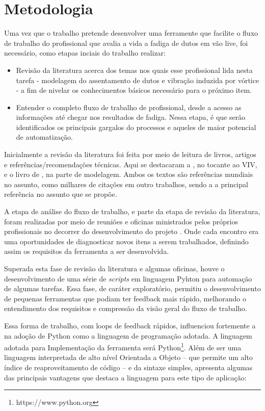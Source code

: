 \chapter{Metodologia}\label{chap:metodologia}


Uma vez que o trabalho pretende desenvolver uma ferramente que facilite o fluxo de trabalho do profissional que avalia a vida a fadiga de dutos em vão live, foi necessário, como etapas inciais do trabalho realizar:

\begin{itemize}
    \item Revisão da literatura acerca dos temas nos quais esse profissional lida nesta tarefa - modelagem do assentamento de dutos e vibração induzida por vórtice - a fim de nivelar os conhecimentos básicos necessário para o próximo item.
    \item Entender o completo fluxo de trabalho de profissional, desde a acesso as informações até chegar nos resultados de fadiga. Nessa etapa, é que serão identificados os principais gargalos do processos e aqueles de maior potencial de automatização.
\end{itemize}

Inicialmente a revisão da literatura foi feita por meio de leitura de livros, artigos e referências/recomendações técnicas.
Aqui se destacaram a , no tocante ao VIV, e o livro de , na parte de modelagem.
Ambos os textos são referências mundiais no assunto, como milhares de citações em outro trabalhos, sendo a  a principal referência no assunto que se propõe.

A etapa de análise do fluxo de trabalho, e parte da etapa de revisão da literatura, foram realizadas por meio de reuniões e oficinas ministrados pelos próprios profissionais no decorrer do desenvolvimento do projeto \integrispan.
Onde cada encontro era uma oportunidades de diagnosticar novos itens a serem trabalhados, definindo assim os requisitos da ferramenta a ser desenvolvida.

Superada esta fase de revisão da literatura e algumas oficinas, houve o desenvolvimento de uma série de \textit{scripts} em linguagem Pyhton para automação de algumas tarefas.
Essa fase, de caráter exploratório, permitiu o desenvolvimento de pequenas ferramentas que podiam ter feedback mais rápido, melhorando o entendimento dos requisitos e compressão da visão geral do fluxo de trabalho.

Essa forma de trabalho, com loops de feedback rápidos, influenciou fortemente a na adoção de Python como a linguagem de programação adotada.
A linguagem adotada para Implementação da ferramenta será Python\footnote{https://www.python.org}.
Além de ser uma linguagem interpretada de alto nível Orientada a Objeto -- que permite um alto índice de reaproveitamento de código -- e da sintaxe simples,  apresenta algumas das principais vantagens que destaca a linguagem para este tipo de aplicação:


